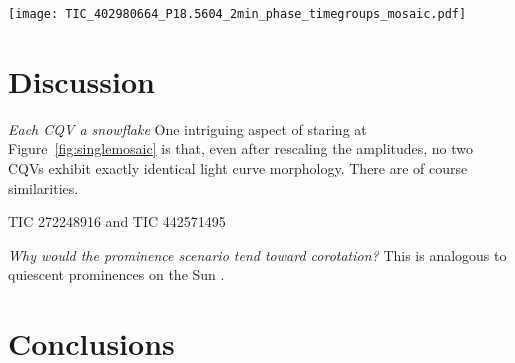\documentclass[11pt,twocolumn,tighten]{aastex63}
\begin{document}
\begin{figure*}[!t]
	\begin{center}
    \centering
    \texttt{[image: TIC\_402980664\_P18.5604\_2min\_phase\_timegroups\_mosaic.pdf]}
		\vspace{-0.45cm}
		\caption{
			{\it Bottom:}
      Evolution of LP 12-502 ($P$=18.6\,h) at fixed period over three
      years; small text denotes cycle number.  The TESS pointing law
      dictates time gaps; larger gaps tend to yield larger shape
      changes.
      The dips usually evolve over tens to hundreds of cycles.
      However cycles 1233-1264 show a dip that ``switched'' from a depth
      and duration of 3\% and 3\,hr to 0.3\% and 1\,hr over less than
      one cycle.
			\vspace{-0.8cm}
		}
		\label{fig:lp}
	\end{center}
\end{figure*}






\section{Discussion}
\label{sec:discussion}

{\it Each CQV a snowflake}
One intriguing aspect of staring at Figure~\ref{fig:singlemosaic}
is that, even after rescaling the amplitudes, no two CQVs
exhibit exactly identical light curve morphology.
There are of course similarities.

TIC 272248916 and TIC 442571495




{\it Why would the prominence scenario tend toward corotation?}
This is analogous to quiescent
prominences on the Sun \citep{1967SoPh....2...39K}.

\section{Conclusions}
\label{sec:conclusion}
\end{document}
